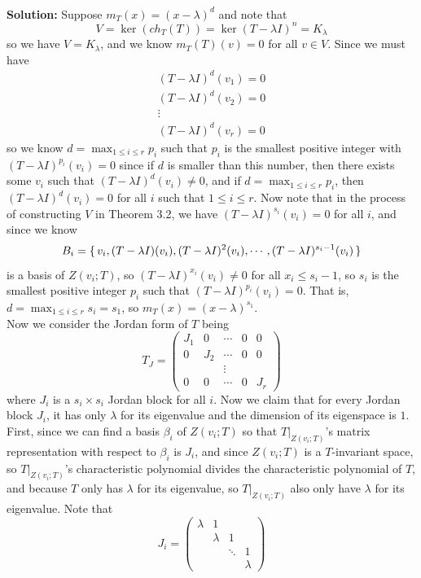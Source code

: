 \documentclass[a4paper]{article}
\theoremstyle{mystyle}
\newcommand{\6}{\partial}
\begin{document}
\hfill \\ \textbf{Solution: }
Suppose $m_T(x)=(x-\lambda)^d$ and note that
\[
   V = \ker (ch_T(T)) = \ker (T-\lambda I)^n = K_\lambda
\]
so we have $V=K_\lambda$, and we know $m_T(T)(v)=0$ for all $v \in V$. Since we must have
\begin {gather*}
(T-\lambda I)^d(v_1)=0 \\ 
(T-\lambda I)^d(v_2)=0 \\
\vdots \\ 
(T-\lambda I)^d(v_r)=0
\end {gather*}
so we know $d=\max_{1 \le i \le r} p_i$ such that $p_i$ is the smallest positive integer 
with $(T-\lambda I)^{p_i}(v_i)=0$ since if $d$ is smaller than
this number, then there exists some $v_i$ such that $(T-\lambda I)^d(v_i) \neq 0$,
and if $d=\max_{1 \le i \le r} p_i$, then $(T-\lambda I)^d(v_i)=0$ for all $i$ such that $1 \le i \le r$.
Now note that in the process of constructing $V$ in Theorem 3.2, we have $(T-\lambda I)^{s_i}(v_i)=0$ for all $i$, 
and since we know
\[ B_i= \set{v_i, (T-\lambda I)(v_i), (T-\lambda I)^2(v_i), \cdots , (T-\lambda I)^{s_i-1}(v_i)}\]
is a basis of $Z(v_i ; T)$, so $(T-\lambda I)^{x_i}(v_i) \neq 0$ for all $x_i \le s_i-1$, so $s_i$ is the 
smallest positive integer $p_i$ such that $(T-\lambda I)^{p_i}(v_i)=0$. That is,
 $d=\max_{1 \le i \le r} s_i = s_1$, so $m_T(x)=(x-\lambda)^{s_1}$. \\
Now we consider the Jordan form of $T$ being
\[
T_J=
\begin{pmatrix}
J_1 &0 &\cdots &0 &0 \\
0 &J_2 &\cdots &0 &0\\
&&\vdots \\ 
0 &0 &\cdots &0 &J_r
\end{pmatrix}
\]
where $J_i$ is a $s_i \times s_i$ Jordan block for all $i$. Now we claim that for every Jordan block
$J_i$, it has only $\lambda$ for its eigenvalue and the dimension of its eigenspace is $1$. First,
 since we can find a basis $\beta_i$ of $Z(v_i;T)$ so that $T|_{Z(v_i;T)}$'s matrix representation 
 with respect to $\beta_i$ is $J_i$, and since $Z(v_i;T)$ is a $T$-invariant space, so $T|_{Z(v_i;T)}$'s characteristic polynomial divides
 the characteristic polynomial of $T$, and because $T$ only has $\lambda$ for its eigenvalue, so $T|_{Z(v_i;T)}$ also only have $\lambda$ for its eigenvalue.
 Note that
 \[
 J_i=
 \begin{pmatrix}
    \lambda &1  \\
    &\lambda &1  \\
    &&\ddots &1\\ 
    &&&\lambda
 \end{pmatrix}
 \]
\end{document}
